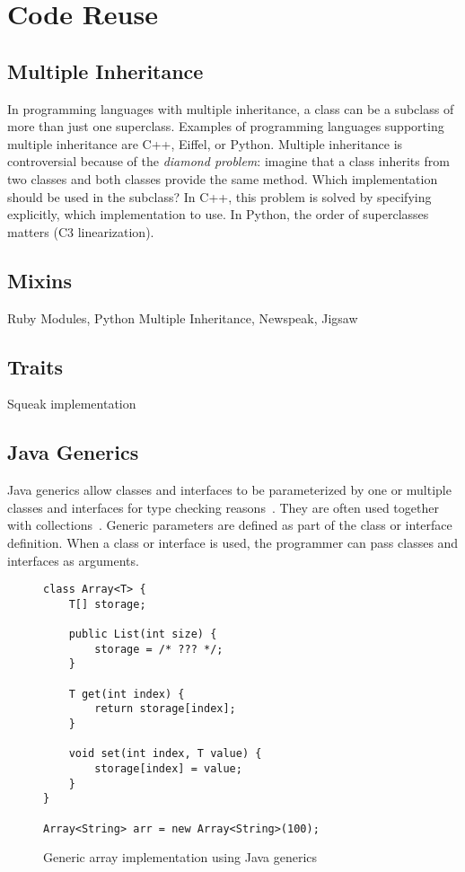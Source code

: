 \section{Code Reuse}

\subsection{Multiple Inheritance}
In programming languages with multiple inheritance, a class can be a subclass of more than just one superclass. Examples of programming languages supporting multiple inheritance are C++, Eiffel, or Python. Multiple inheritance is controversial because of the \emph{diamond problem}: imagine that a class inherits from two classes and both classes provide the same method. Which implementation should be used in the subclass? In C++, this problem is solved by specifying explicitly, which implementation to use. In Python, the order of superclasses matters (C3 linearization).

\subsection{Mixins}
Ruby Modules, Python Multiple Inheritance, Newspeak, Jigsaw

\subsection{Traits}
\label{sec:rel_traits}
Squeak implementation

\subsection{Java Generics}
Java generics allow classes and interfaces to be parameterized by one or multiple classes and interfaces for type checking reasons~\cite{bracha2004generics}. They are often used together with collections~\cite{Parnin:2011:JGA:1985441.1985446}. Generic parameters are defined as part of the class or interface definition. When a class or interface is used, the programmer can pass classes and interfaces as arguments.

\begin{figure}[!htp]
\begin{lstlisting}
class Array<T> {
    T[] storage;

    public List(int size) {
        storage = /* ??? */;
    }

    T get(int index) {
        return storage[index];
    }

    void set(int index, T value) {
        storage[index] = value;
    }
}

Array<String> arr = new Array<String>(100);
\end{lstlisting}
\caption{Generic array implementation using Java generics}
\label{fig:rel_java_generics}
\end{figure}


